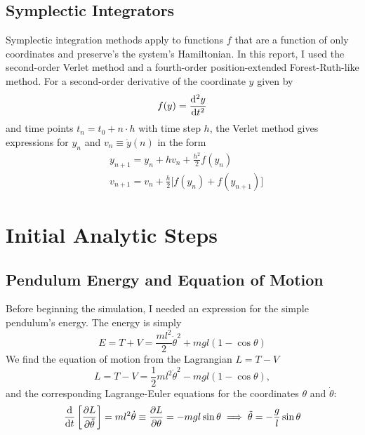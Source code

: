 \documentclass[11pt, a4paper]{article}
\begin{document}
\subsection{Symplectic Integrators}
Symplectic integration methods apply to functions $ f $ that are a function of only coordinates and preserve's the system's Hamiltonian. In this report, I used the second-order Verlet method and a fourth-order position-extended Forest-Ruth-like method. For a second-order derivative of the coordinate $ y $ given by
\begin{equation*}
	f(y) = \dv[2]{y}{t}
\end{equation*}
and time points $ t_{n} = t_{0} + n\cdot h $ with time step $ h $, the Verlet method gives expressions for $ y_{n} $ and $ v_{n} \equiv \dot{y}(n) $ in the form
\begin{align*}
	& y_{n+1} = y_{n} + hv_{n} + \frac{h^{2}}{2}f(y_{n})\\
	&v_{n+1} = v_{n} + \frac{h}{2}\big[f(y_{n}) + f(y_{n+1})\big]
\end{align*}

\section{Initial Analytic Steps}  \label{newton:s:solution}

\subsection{Pendulum Energy and Equation of Motion}
Before beginning the simulation, I needed an expression for the simple pendulum's energy. The energy is simply
\begin{equation*}
	E = T + V = \frac{ml^{2}}{2}\dot{\theta}^{2} + mgl\left(1 - \cos \theta \right)
\end{equation*}
We find the equation of motion from the Lagrangian $ L = T - V $
\begin{equation*}
	L = T - V = \frac{1}{2}ml^{2} \dot{\theta}^{2} - mgl\left(1 - \cos \theta\right),
\end{equation*}
and the corresponding Lagrange-Euler equations for the coordinates $ \theta $ and $ \dot{\theta} $:
\begin{equation*}
	\dv{t}\left[\pdv{L}{\ddot{\theta}}\right] = ml^{2}\dot{\theta} \equiv \pdv{L}{\theta} = -mgl \sin \theta \implies \ddot{\theta} = -\frac{g}{l}\sin \theta
\end{equation*}
\end{document}
